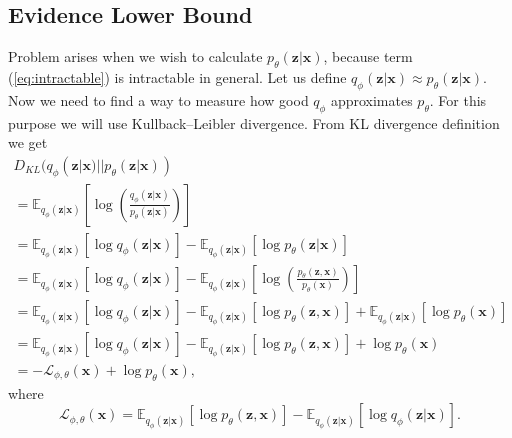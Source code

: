 \documentclass[10pt]{article}
\begin{document}
\subsection{Evidence Lower Bound}
Problem arises when we wish to calculate $p_{\theta}(\textbf{z}|\textbf{x})$, because term (\ref{eq:intractable}) is intractable in general.
Let us define $q_{\phi }(\textbf{z}|\textbf{x})  
\approx p_{\theta }(\textbf{z}|\textbf{x})$. Now we need to find a way to measure how good $q_{\phi }$ approximates $p_{\theta }$. For this purpose we will use  Kullback–Leibler divergence. From KL divergence definition we get
\begin{gather}
D_{KL}(q_{\phi }(\textbf{z}|\textbf{x})  || p_{\theta }(\textbf{z}|\textbf{x}) ) \\
= \mathbb{E}_{q_{\phi }(\textbf{z}|\textbf{x})}
\left[\log \left( \frac{ q_{\phi }(\textbf{z}|\textbf{x})}{p_{\theta }(\textbf{z}|\textbf{x})} \right) \right] \\
= \mathbb{E}_{q_{\phi }(\textbf{z}|\textbf{x})} \left[ \log q_{\phi }(\textbf{z}|\textbf{x}) \right] -
\mathbb{E}_{q_{\phi }(\textbf{z}|\textbf{x})} \left[ \log p_{\theta }(\textbf{z}|\textbf{x}) \right] \\
= \mathbb{E}_{q_{\phi }(\textbf{z}|\textbf{x})} \left[ \log q_{\phi }(\textbf{z}|\textbf{x}) \right] -
\mathbb{E}_{q_{\phi }(\textbf{z}|\textbf{x})}
\left[ \log \left(
\frac{ p_{\theta }(\textbf{z},\textbf{x})}{ p_{\theta }(\textbf{x})}
\right) \right] \\
= \mathbb{E}_{q_{\phi }(\textbf{z}|\textbf{x})} \left[ \log q_{\phi }(\textbf{z}|\textbf{x}) \right]
- \mathbb{E}_{q_{\phi }(\textbf{z}|\textbf{x})} \left[ \log p_{\theta }(\textbf{z}, \textbf{x}) \right]
+  \mathbb{E}_{q_{\phi }(\textbf{z}|\textbf{x})} \left[ \log p_{\theta }(\textbf{x}) \right] \\
= \mathbb{E}_{q_{\phi }(\textbf{z}|\textbf{x})} \left[ \log q_{\phi }(\textbf{z}|\textbf{x}) \right]
- \mathbb{E}_{q_{\phi }(\textbf{z}|\textbf{x})} \left[ \log p_{\theta }(\textbf{z}, \textbf{x}) \right] +
\log p_{\theta}( \textbf{x}) \\
= -\mathcal{L}_{\phi, \theta}(\textbf{x}) + \log p_{\theta}( \textbf{x}),
\end{gather}
where  
\begin{equation} \label{eq:ELBO}
    \mathcal{L}_{\phi, \theta}(\textbf{x}) = 
    \mathbb{E}_{q_{\phi }(\textbf{z}|\textbf{x})} \left[ \log p_{\theta }(\textbf{z}, \textbf{x}) \right] - 
    \mathbb{E}_{q_{\phi }(\textbf{z}|\textbf{x})} \left[ \log q_{\phi }(\textbf{z}|\textbf{x}) \right].
\end{equation}
\end{document}
